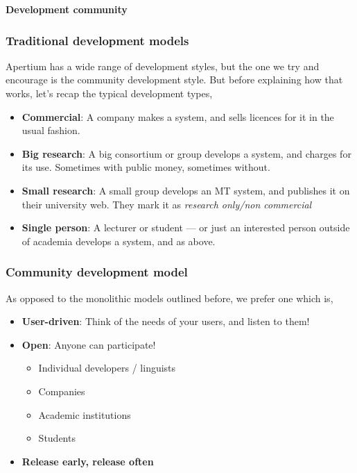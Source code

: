 \documentclass[10pt,xetex]{beamer} %
\begin{document}

\begin{frame} %
 \begin{center}
 {\Large {\bf Development community}}%
 \end{center}
\end{frame}


\begin{frame}
  \frametitle{Traditional development models} %

Apertium has a wide range of development styles, but the one we try and encourage
is the community development style. But before explaining how that works, let's recap
the typical development types, 

\begin{itemize}
  \item {\bf Commercial}: A company makes a system, and sells licences for it in the usual fashion.
  \item {\bf Big research}: A big consortium or group develops a system, and charges for its use. Sometimes with public money, sometimes without.
  \item {\bf Small research}: A small group develops an MT system, and publishes it on their university web. They mark it as {\em research only/non commercial}
 \item {\bf Single person}: A lecturer or student --- or just an interested person outside of academia develops a system, and as above.
\end{itemize}

\end{frame}


\begin{frame}
  \frametitle{Community development model}

As opposed to the monolithic models outlined before, we prefer one which is,

\begin{itemize}
  \item {\bf User-driven}: Think of the needs of your users, and listen to them!
  \item {\bf Open}: Anyone can participate!
  \begin{itemize}
    \item Individual developers / linguists
    \item Companies
    \item Academic institutions
    \item Students
  \end{itemize}
  \item {\bf Release early, release often}
\end{itemize}

\end{frame}
\end{document}
